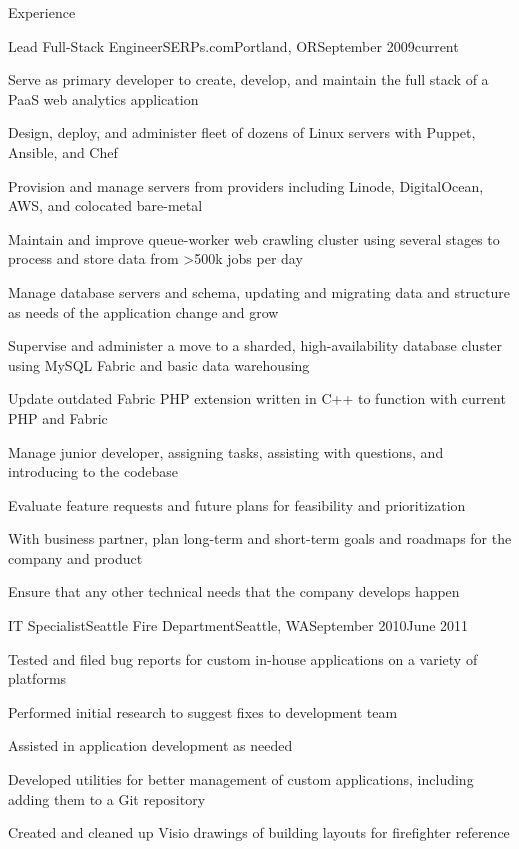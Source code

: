 \documentclass[letterpaper,10pt]{article}
\begin{document}
\begin{res_section}{Experience}
\begin{res_experienceitem}{Lead Full-Stack Engineer}{SERPs.com}{Portland, OR}{September 2009}{current}
  \item Serve as primary developer to create, develop, and maintain the full stack of a PaaS web analytics application
  \item Design, deploy, and administer fleet of dozens of Linux servers with Puppet, Ansible, and Chef
  \item Provision and manage servers from providers including Linode, DigitalOcean, AWS, and colocated bare-metal
  \item Maintain and improve queue-worker web crawling cluster using several stages to process and store data from \textgreater500k jobs per day
  \item Manage database servers and schema, updating and migrating data and structure as needs of the application change and grow
  \item Supervise and administer a move to a sharded, high-availability database cluster using MySQL Fabric and basic data warehousing
  \item Update outdated Fabric PHP extension written in C++ to function with current PHP and Fabric
  \item Manage junior developer, assigning tasks, assisting with questions, and introducing to the codebase
  \item Evaluate feature requests and future plans for feasibility and prioritization
  \item With business partner, plan long-term and short-term goals and roadmaps for the company and product
  \item Ensure that any other technical needs that the company develops happen
\end{res_experienceitem}
\begin{res_experienceitem}{IT Specialist}{Seattle Fire Department}{Seattle, WA}{September 2010}{June 2011}
  \item Tested and filed bug reports for custom in-house applications on a variety of platforms
  \item Performed initial research to suggest fixes to development team
  \item Assisted in application development as needed
  \item Developed utilities for better management of custom applications, including adding them to a Git repository
  \item Created and cleaned up Visio drawings of building layouts for firefighter reference

\end{res_experienceitem}
\end{res_section}
\end{document}
